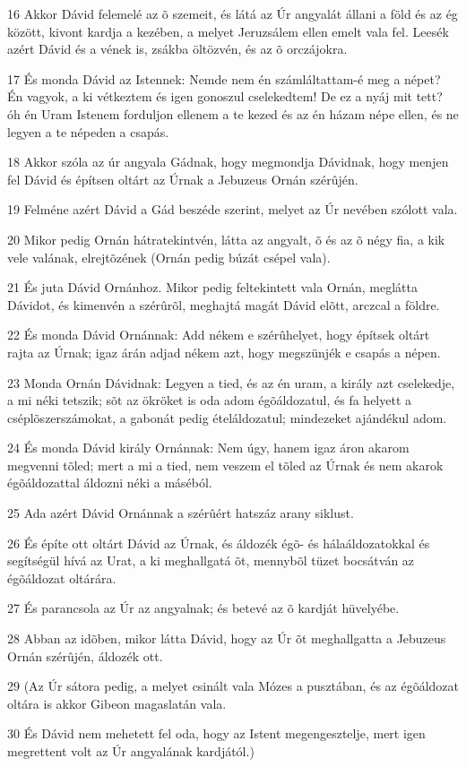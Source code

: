 \par 16 Akkor Dávid felemelé az õ szemeit, és látá az Úr angyalát állani a föld és az ég között, kivont kardja a kezében, a melyet Jeruzsálem ellen emelt vala fel. Leesék azért Dávid és a vének is, zsákba öltözvén, és az õ orczájokra.
\par 17 És monda Dávid az Istennek: Nemde nem én számláltattam-é meg a népet? Én vagyok, a ki vétkeztem és igen gonoszul cselekedtem! De ez a nyáj mit tett? óh én Uram Istenem forduljon ellenem a te kezed és az én házam népe ellen, és ne legyen a te népeden a csapás.
\par 18 Akkor szóla az úr angyala Gádnak, hogy megmondja Dávidnak, hogy menjen fel Dávid és építsen oltárt az Úrnak a Jebuzeus Ornán szérûjén.
\par 19 Felméne azért Dávid a Gád beszéde szerint, melyet az Úr nevében szólott vala.
\par 20 Mikor pedig Ornán hátratekintvén, látta az angyalt, õ és az õ négy fia, a kik vele valának, elrejtõzének (Ornán pedig búzát csépel vala).
\par 21 És juta Dávid Ornánhoz. Mikor pedig feltekintett vala Ornán, meglátta Dávidot, és kimenvén a szérûrõl, meghajtá magát Dávid elõtt, arczcal a földre.
\par 22 És monda Dávid Ornánnak: Add nékem e szérûhelyet, hogy építsek oltárt rajta az Úrnak; igaz árán adjad nékem azt, hogy megszünjék e csapás a népen.
\par 23 Monda Ornán Dávidnak: Legyen a tied, és az én uram, a király azt cselekedje, a mi néki tetszik; sõt az ökröket is oda adom égõáldozatul, és fa helyett a cséplõszerszámokat, a gabonát pedig ételáldozatul; mindezeket ajándékul adom.
\par 24 És monda Dávid király Ornánnak: Nem úgy, hanem igaz áron akarom megvenni tõled; mert a mi a tied, nem veszem el tõled az Úrnak és nem akarok égõáldozattal áldozni néki a máséból.
\par 25 Ada azért Dávid Ornánnak a szérûért hatszáz arany siklust.
\par 26 És építe ott oltárt Dávid az Úrnak, és áldozék égõ- és hálaáldozatokkal és segítségül hívá az Urat, a ki meghallgatá õt, mennybõl tüzet bocsátván az égõáldozat oltárára.
\par 27 És parancsola az Úr az angyalnak; és betevé az õ kardját hüvelyébe.
\par 28 Abban az idõben, mikor látta Dávid, hogy az Úr õt meghallgatta a Jebuzeus Ornán szérûjén, áldozék ott.
\par 29 (Az Úr sátora pedig, a melyet csinált vala Mózes a pusztában, és az égõáldozat oltára is akkor Gibeon magaslatán  vala.
\par 30 És Dávid nem mehetett fel oda, hogy az Istent megengesztelje, mert igen megrettent volt az Úr angyalának kardjától.)

